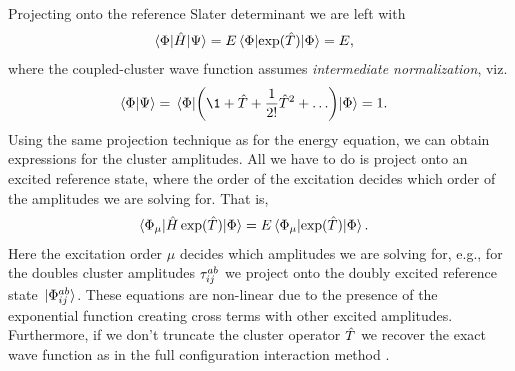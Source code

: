         Projecting onto the reference Slater determinant we are left with
        \begin{align}
            \mel*{\slat}{\hamil}{\Psi}
            &= \energy\mel*{\slat}{\exponential(\clust)}{\slat}
            = \energy,
            \label{eq:cc_energy}
        \end{align}
        where the coupled-cluster wave function assumes \emph{intermediate
        normalization}, viz.
        \begin{align}
            \braket*{\slat}{\Psi}
            &= \mel*{\slat}{
                \para{
                    \1 + \clust + \frac{1}{2!}\clust^2 + \dots
                }
            }{\slat}
            = 1.
        \end{align}
        Using the same projection technique as for the energy equation, we can
        obtain expressions for the cluster amplitudes.
        All we have to do is project onto an excited reference state, where the
        order of the excitation decides which order of the amplitudes we are
        solving for.
        That is,
        \begin{align}
            \mel*{\slat_{\mu}}{
                \hamil \exponential(\clust)
            }{\slat}
            &= \energy \mel*{\slat_{\mu}}{
                \exponential(\clust)
            }{\slat}.
            \label{eq:cc_amp}
        \end{align}
        Here the excitation order $\mu$ decides which amplitudes we are solving
        for, e.g., for the doubles cluster amplitudes $\tau^{ab}_{ij}$ we
        project onto the doubly excited reference state
        $\ket*{\Phi^{ab}_{ij}}$.
        These equations are non-linear due to the presence of the exponential
        function creating cross terms with other excited amplitudes.
        Furthermore, if we don't truncate the cluster operator $\hat{T}$ we
        recover the exact wave function as in the full configuration
        interaction method \cite{coester1958421, monkhorst1977421}.


